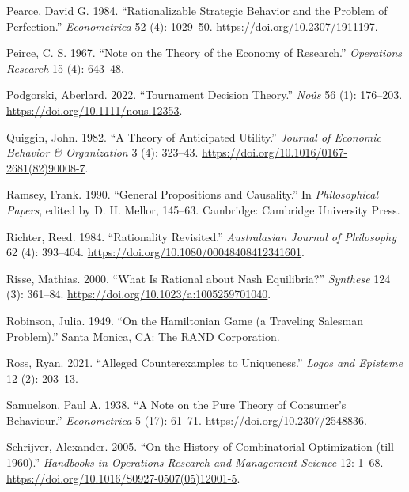\documentclass[
  12pt,
  letterpaper,
  DIV=11,
  numbers=noendperiod]{scrreprt}
\newlength{\cslhangindent}
\newlength{\cslentryspacingunit} %
\newenvironment{CSLReferences}[2] %
 {%
  \setlength{\parindent}{0pt}
  \ifodd #1
  \let\oldpar\par
  \def\par{\hangindent=\cslhangindent\oldpar}
  \fi
  \setlength{\parskip}{#2\cslentryspacingunit}
 }%
 {}
\begin{document}
\begin{CSLReferences}{1}{0}
\leavevmode{}%
Pearce, David G. 1984. {``Rationalizable Strategic Behavior and the
Problem of Perfection.''} \emph{Econometrica} 52 (4): 1029--50.
\url{https://doi.org/10.2307/1911197}.

\leavevmode{}%
Peirce, C. S. 1967. {``Note on the Theory of the Economy of Research.''}
\emph{Operations Research} 15 (4): 643--48.

\leavevmode{}%
Podgorski, Aberlard. 2022. {``Tournament Decision Theory.''}
\emph{No{û}s} 56 (1): 176--203.
\url{https://doi.org/10.1111/nous.12353}.

\leavevmode{}%
Quiggin, John. 1982. {``A Theory of Anticipated Utility.''}
\emph{Journal of Economic Behavior \& Organization} 3 (4): 323--43.
\url{https://doi.org/10.1016/0167-2681(82)90008-7}.

\leavevmode{}%
Ramsey, Frank. 1990. {``General Propositions and Causality.''} In
\emph{Philosophical Papers}, edited by D. H. Mellor, 145--63. Cambridge:
Cambridge University Press.

\leavevmode{}%
Richter, Reed. 1984. {``Rationality Revisited.''} \emph{Australasian
Journal of Philosophy} 62 (4): 393--404.
\url{https://doi.org/10.1080/00048408412341601}.

\leavevmode{}%
Risse, Mathias. 2000. {``What Is Rational about Nash Equilibria?''}
\emph{Synthese} 124 (3): 361--84.
\url{https://doi.org/10.1023/a:1005259701040}.

\leavevmode{}%
Robinson, Julia. 1949. {``On the Hamiltonian Game (a Traveling Salesman
Problem).''} Santa Monica, CA: The RAND Corporation.

\leavevmode{}%
Ross, Ryan. 2021. {``Alleged Counterexamples to Uniqueness.''}
\emph{Logos and Episteme} 12 (2): 203--13.

\leavevmode{}%
Samuelson, Paul A. 1938. {``A Note on the Pure Theory of Consumer's
Behaviour.''} \emph{Econometrica} 5 (17): 61--71.
\url{https://doi.org/10.2307/2548836}.

\leavevmode{}%
Schrijver, Alexander. 2005. {``On the History of Combinatorial
Optimization (till 1960).''} \emph{Handbooks in Operations Research and
Management Science} 12: 1--68.
\url{https://doi.org/10.1016/S0927-0507(05)12001-5}.


\end{CSLReferences}
\end{document}
